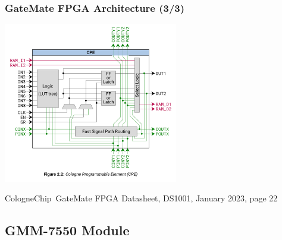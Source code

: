 \begin{frame}
  \frametitle{GateMate FPGA Architecture (3/3)}
  \vspace{-.5cm}
  \begin{center}
    \includegraphics[height=7cm]{Figure_2.2.png}
  \end{center}
  \vspace{-2.5cm}
  \begin{flushright}
  \begin{minipage}{3.7cm}
  \footnotesize{{CologneChip~GateMate} FPGA Datasheet, DS1001, January 2023, page 22}
  \end{minipage}
  \end{flushright}
\end{frame}

\subsection{GMM-7550 Module}

